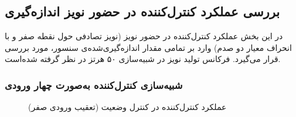 
\subsection{بررسی عملكرد کنترل‌کننده در حضور نويز اندازه‌گیری}\label{3dof_noise}
در این بخش عملکرد کنترل‌کننده در حضور نویز (نویز تصادفی حول نقطه صفر و با انحراف معیار دو صدم) وارد بر تمامی مقدار  اندازه‌گیری‌شده‌ی سنسور، مورد بررسی قرار می‌گیرد. فرکانس تولید نویز در شبیه‌سازی ۵۰ هرتز در نظر گرفته شده‌است.
\subsubsection{شبیه‌سازی کنترل‌کننده به‌صورت چهار ورودی}


\begin{figure}[H]
	\centering
	\caption{‫‪عملکرد کنترل‌کننده  در کنترل وضعیت (تعقیب ورودی صفر)}
	\label{lqidg_roll_pitch_yaw_fig_simulation_MIMO_noise}
\end{figure}


